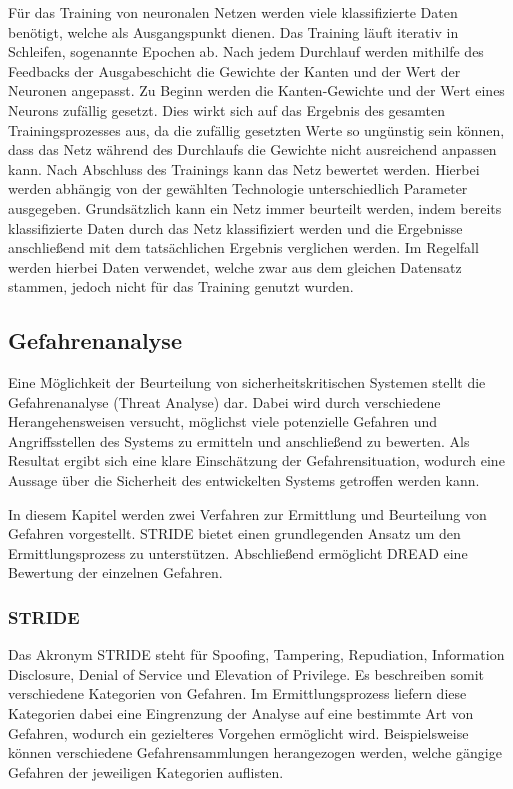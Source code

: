 Für das Training von neuronalen Netzen werden viele klassifizierte Daten benötigt, welche als Ausgangspunkt dienen.
Das Training läuft iterativ in Schleifen, sogenannte Epochen ab.
Nach jedem Durchlauf werden mithilfe des Feedbacks der Ausgabeschicht die Gewichte der Kanten und der Wert der Neuronen angepasst.
Zu Beginn werden die Kanten-Gewichte und der Wert eines Neurons zufällig gesetzt.
Dies wirkt sich auf das Ergebnis des gesamten Trainingsprozesses aus, da die zufällig gesetzten Werte so ungünstig sein können, dass das Netz während des Durchlaufs die Gewichte nicht ausreichend anpassen kann.
Nach Abschluss des Trainings kann das Netz bewertet werden.
Hierbei werden abhängig von der gewählten Technologie unterschiedlich Parameter ausgegeben.
Grundsätzlich kann ein Netz immer beurteilt werden, indem bereits klassifizierte Daten durch das Netz klassifiziert werden und die Ergebnisse anschließend mit dem tatsächlichen Ergebnis verglichen werden.
Im Regelfall werden hierbei Daten verwendet, welche zwar aus dem gleichen Datensatz stammen, jedoch nicht für das Training genutzt wurden.
\autocite[vgl.][]{marcel_mikl_wie_2018}

\subsection{Gefahrenanalyse}

\textauthor{\vLB}{}{}

Eine Möglichkeit der Beurteilung von sicherheitskritischen Systemen stellt die Gefahrenanalyse (Threat Analyse) dar.
Dabei wird durch verschiedene Herangehensweisen versucht, möglichst viele potenzielle Gefahren und Angriffsstellen des Systems zu ermitteln und anschließend zu bewerten.
Als Resultat ergibt sich eine klare Einschätzung der Gefahrensituation, wodurch eine Aussage über die Sicherheit des entwickelten Systems getroffen werden kann.

In diesem Kapitel werden zwei Verfahren zur Ermittlung und Beurteilung von Gefahren vorgestellt.
STRIDE bietet einen grundlegenden Ansatz um den Ermittlungsprozess zu unterstützen.
Abschließend ermöglicht DREAD eine Bewertung der einzelnen Gefahren.

\subsubsection{STRIDE}\label{sec:stride}
Das Akronym STRIDE steht für Spoofing, Tampering, Repudiation, Information Disclosure, Denial of Service und Elevation of Privilege.
Es beschreiben somit verschiedene Kategorien von Gefahren.
Im Ermittlungsprozess liefern diese Kategorien dabei eine Eingrenzung der Analyse auf eine bestimmte Art von Gefahren, wodurch ein gezielteres Vorgehen ermöglicht wird.
Beispielsweise können verschiedene Gefahrensammlungen herangezogen werden, welche gängige Gefahren der jeweiligen Kategorien auflisten.

